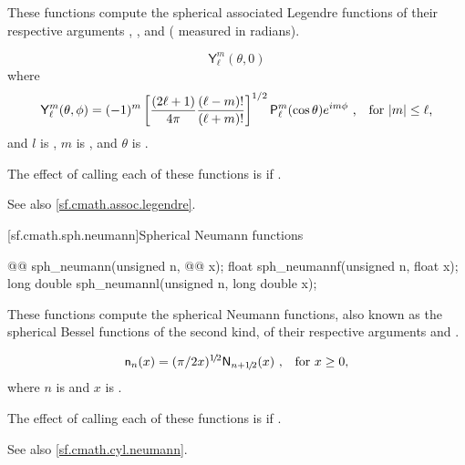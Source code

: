 \begin{itemdescr}
\pnum
\effects
These functions compute the spherical associated Legendre functions
of their respective arguments
, , and  ( measured in radians).

\pnum
\returns
\[ \mathsf{Y}_\ell^m(\theta, 0) \]
where
\[ \mathsf{Y}_\ell^m(\theta, \phi) =
     (-1)^m \left[\frac{(2 \ell + 1)}{4 \pi} \frac{(\ell - m)!}{(\ell + m)!}\right]^{1/2}
     \mathsf{P}_\ell^m (\cos\theta) e^{i m \phi}
     \text{ ,\quad for $|m| \le \ell$,}
\]
and
$l$ is ,
$m$ is , and
$\theta$ is .

\pnum
\remarks
The effect of calling each of these functions
is 
if .

\pnum
See also \ref{sf.cmath.assoc.legendre}.
\end{itemdescr}

[sf.cmath.sph.neumann]{Spherical Neumann functions}%
%
%
%
%
%
%
\begin{itemdecl}
@@ sph_neumann(unsigned n, @@ x);
float        sph_neumannf(unsigned n, float x);
long double  sph_neumannl(unsigned n, long double x);
\end{itemdecl}

\begin{itemdescr}
\pnum
\effects
These functions compute the spherical Neumann functions,
also known as the spherical Bessel functions of the second kind,
of their respective arguments
 and .

\pnum
\returns
\[ \mathsf{n}_n(x) = (\pi/2x)^{1\!/\!2} \mathsf{N}_{n + 1\!/\!2}(x)
   \text{ ,\quad for $x \ge 0$,} \]
where
$n$ is  and
$x$ is .

\pnum
\remarks
The effect of calling each of these functions
is 
if .

\pnum
See also \ref{sf.cmath.cyl.neumann}.
\end{itemdescr}



